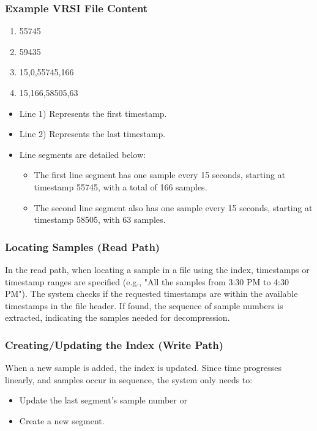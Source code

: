 \documentclass[conference]{IEEEtran}
\begin{document}
\subsubsection{Example VRSI File Content}

\begin{enumerate}
    \item 55745
    \item 59435
    \item 15,0,55745,166
    \item 15,166,58505,63
\end{enumerate}


\begin{itemize}
    \item Line 1) Represents the first timestamp.
    \item Line 2) Represents the last timestamp.
    \item Line segments are detailed below:
    \begin{itemize}
        \item The first line segment has one sample every 15 seconds, starting at timestamp 55745, with a total of 166 samples.
        \item The second line segment also has one sample every 15 seconds, starting at timestamp 58505, with 63 samples.
    \end{itemize}
\end{itemize}

\subsubsection{Locating Samples (Read Path)}

In the read path, when locating a sample in a file using the index, timestamps or timestamp ranges are specified (e.g., "All the samples from 3:30 PM to 4:30 PM"). The system checks if the requested timestamps are within the available timestamps in the file header. If found, the sequence of sample numbers is extracted, indicating the samples needed for decompression.

\subsubsection{Creating/Updating the Index (Write Path)}

When a new sample is added, the index is updated. Since time progresses linearly, and samples occur in sequence, the system only needs to:
\begin{itemize}
    \item Update the last segment's sample number or
    \item Create a new segment.
\end{itemize}
\end{document}
